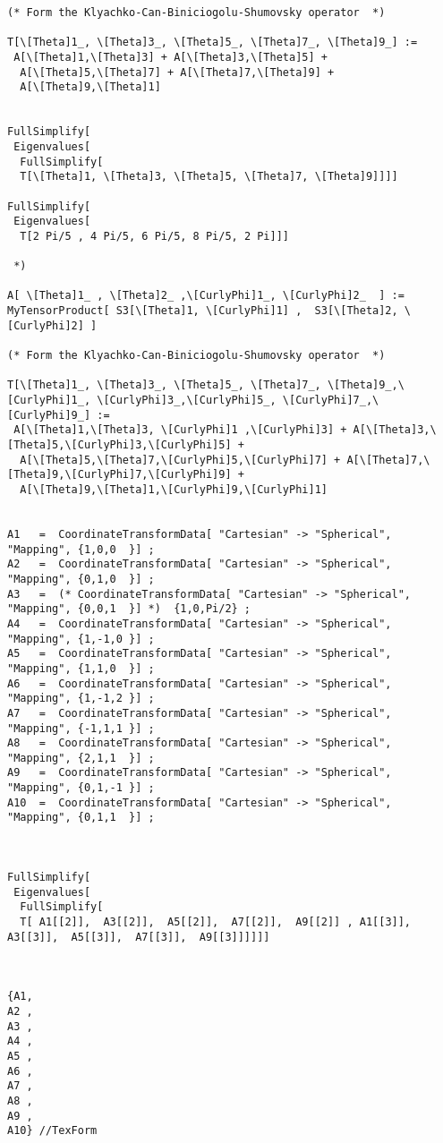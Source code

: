 \documentclass[%
  twocolumn,
 showpacs,
 showkeys,
 preprintnumbers,
 amsmath,amssymb,
 aps,
  pra,
  longbibliography,
 floatfix,
 ]{revtex4-1}
\begin{document}
{\begin{lstlisting}[backgroundcolor=\color{yellow!10},framerule=0pt,breaklines=true, frame=tb]
(* Form the Klyachko-Can-Biniciogolu-Shumovsky operator  *)

T[\[Theta]1_, \[Theta]3_, \[Theta]5_, \[Theta]7_, \[Theta]9_] :=
 A[\[Theta]1,\[Theta]3] + A[\[Theta]3,\[Theta]5] +
  A[\[Theta]5,\[Theta]7] + A[\[Theta]7,\[Theta]9] +
  A[\[Theta]9,\[Theta]1]


FullSimplify[
 Eigenvalues[
  FullSimplify[
  T[\[Theta]1, \[Theta]3, \[Theta]5, \[Theta]7, \[Theta]9]]]]

FullSimplify[
 Eigenvalues[
  T[2 Pi/5 , 4 Pi/5, 6 Pi/5, 8 Pi/5, 2 Pi]]]

 *)

A[ \[Theta]1_ , \[Theta]2_ ,\[CurlyPhi]1_, \[CurlyPhi]2_  ] :=   MyTensorProduct[ S3[\[Theta]1, \[CurlyPhi]1] ,  S3[\[Theta]2, \[CurlyPhi]2] ]

(* Form the Klyachko-Can-Biniciogolu-Shumovsky operator  *)

T[\[Theta]1_, \[Theta]3_, \[Theta]5_, \[Theta]7_, \[Theta]9_,\[CurlyPhi]1_, \[CurlyPhi]3_,\[CurlyPhi]5_, \[CurlyPhi]7_,\[CurlyPhi]9_] :=
 A[\[Theta]1,\[Theta]3, \[CurlyPhi]1 ,\[CurlyPhi]3] + A[\[Theta]3,\[Theta]5,\[CurlyPhi]3,\[CurlyPhi]5] +
  A[\[Theta]5,\[Theta]7,\[CurlyPhi]5,\[CurlyPhi]7] + A[\[Theta]7,\[Theta]9,\[CurlyPhi]7,\[CurlyPhi]9] +
  A[\[Theta]9,\[Theta]1,\[CurlyPhi]9,\[CurlyPhi]1]


A1   =  CoordinateTransformData[ "Cartesian" -> "Spherical", "Mapping", {1,0,0  }] ;
A2   =  CoordinateTransformData[ "Cartesian" -> "Spherical", "Mapping", {0,1,0  }] ;
A3   =  (* CoordinateTransformData[ "Cartesian" -> "Spherical", "Mapping", {0,0,1  }] *)  {1,0,Pi/2} ;
A4   =  CoordinateTransformData[ "Cartesian" -> "Spherical", "Mapping", {1,-1,0 }] ;
A5   =  CoordinateTransformData[ "Cartesian" -> "Spherical", "Mapping", {1,1,0  }] ;
A6   =  CoordinateTransformData[ "Cartesian" -> "Spherical", "Mapping", {1,-1,2 }] ;
A7   =  CoordinateTransformData[ "Cartesian" -> "Spherical", "Mapping", {-1,1,1 }] ;
A8   =  CoordinateTransformData[ "Cartesian" -> "Spherical", "Mapping", {2,1,1  }] ;
A9   =  CoordinateTransformData[ "Cartesian" -> "Spherical", "Mapping", {0,1,-1 }] ;
A10  =  CoordinateTransformData[ "Cartesian" -> "Spherical", "Mapping", {0,1,1  }] ;



FullSimplify[
 Eigenvalues[
  FullSimplify[
  T[ A1[[2]],  A3[[2]],  A5[[2]],  A7[[2]],  A9[[2]] , A1[[3]],  A3[[3]],  A5[[3]],  A7[[3]],  A9[[3]]]]]]



{A1,
A2 ,
A3 ,
A4 ,
A5 ,
A6 ,
A7 ,
A8 ,
A9 ,
A10} //TexForm

\end{lstlisting}  }
\end{document}
